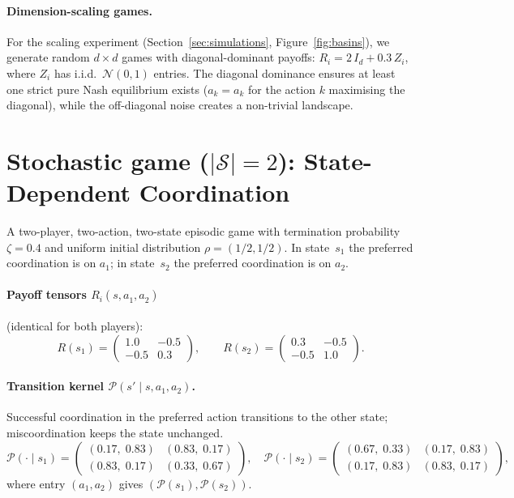 \documentclass[a4paper,oneside,11pt]{report}
\newcommand{\calS}{\mathcal{S}}
\numberwithin{theorem}{chapter}
\numberwithin{equation}{chapter}
\begin{document}
\paragraph{Dimension-scaling games.}
For the scaling experiment (Section~\ref{sec:simulations},
Figure~\ref{fig:basins}), we generate random $d \times d$ games with
diagonal-dominant payoffs:
$R_i = 2\,I_d + 0.3\,Z_i$, where $Z_i$ has i.i.d.\
$\mathcal{N}(0,1)$ entries. The diagonal dominance ensures at least
one strict pure Nash equilibrium exists ($a_k = a_k$ for the action
$k$ maximising the diagonal), while the off-diagonal noise creates
a non-trivial landscape.

\section*{Stochastic game ($|\calS| = 2$): State-Dependent Coordination}

A two-player, two-action, two-state episodic game with termination
probability $\zeta = 0.4$ and uniform initial distribution
$\rho = (1/2, 1/2)$. In state~$s_1$ the preferred coordination is
on $a_1$; in state~$s_2$ the preferred coordination is on $a_2$.

\paragraph{Payoff tensors $R_i(s, a_1^{}, a_2^{})$} (identical for
both players):
\[
R(s_1) = \begin{pmatrix} 1.0 & -0.5 \\ -0.5 & 0.3 \end{pmatrix},
\qquad
R(s_2) = \begin{pmatrix} 0.3 & -0.5 \\ -0.5 & 1.0 \end{pmatrix}.
\]

\paragraph{Transition kernel $\mathcal{P}(s' \mid s, a_1, a_2)$.}
Successful coordination in the preferred action transitions to the
other state; miscoordination keeps the state unchanged.
\[
\mathcal{P}(\cdot \mid s_1) =
\begin{pmatrix}
  (0.17,\; 0.83) & (0.83,\; 0.17) \\
  (0.83,\; 0.17) & (0.33,\; 0.67)
\end{pmatrix},
\quad
\mathcal{P}(\cdot \mid s_2) =
\begin{pmatrix}
  (0.67,\; 0.33) & (0.17,\; 0.83) \\
  (0.17,\; 0.83) & (0.83,\; 0.17)
\end{pmatrix},
\]
where entry $(a_1, a_2)$ gives $(\mathcal{P}(s_1), \mathcal{P}(s_2))$.
\end{document}
